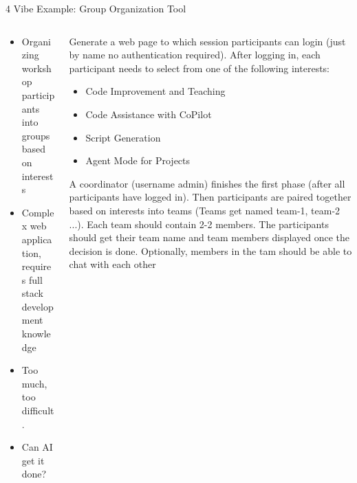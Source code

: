 \documentclass[xcolor=dvipsnames, aspectratio=169]{beamer}
\begin{document}
\begin{frame}{4 Vibe Example: Group Organization Tool}
  \begin{columns}
    \begin{column}{0.5\textwidth}
      \begin{itemize}
        \item Organizing workshop participants into groups based on interests
        \item Complex web application, requires full stack development knowledge
        \item Too much, too difficult.
        \item Can AI get it done?
      \end{itemize}
    \end{column}
    
    \begin{column}{0.5\textwidth}
      \begin{promptbox}\footnotesize
        Generate a web page to which session participants can login (just by name no authentication required). After logging in, each participant needs to select from one of the following interests:
        \begin{itemize}\vspace{-0.5em}
          \item Code Improvement and Teaching
          \vspace{-0.5em}
          \item Code Assistance with CoPilot
          \vspace{-0.5em}
          \item Script Generation
          \vspace{-0.5em}
          \item Agent Mode for Projects
          \vspace{-0.5em}
       \end{itemize}
A coordinator (username admin) finishes the first phase (after all participants have logged in). Then participants are paired together based on interests into teams (Teams get named team-1, team-2 ...). Each team should contain 2-2 members. The participants should get their team name and team members displayed once the decision is done. Optionally, members in the tam should be able to chat with each other
      \end{promptbox}
    \end{column}
  \end{columns}
\end{frame}
\end{document}

